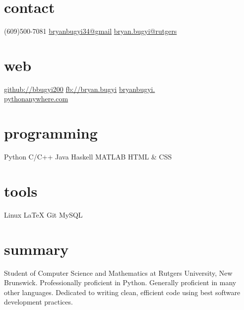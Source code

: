 \documentclass[]{friggeri-cv}
\newlength\myheight
\newlength\mydepth
\newcommand*\inlinegraphics[2]{%
  \settototalheight\myheight{Xygp}%
  \settodepth\mydepth{Xygp}%
  \raisebox{-\mydepth}{\texttt{[image: \#1]}}%
}
\begin{document}

\begin{aside}
  \section{contact}
    (609)500-7081
    \href{mailto:bryanbugyi34@gmail.com}{bryanbugyi34@gmail}
    \href{mailto:bryan.bugyi@rutgers.edu}{bryan.bugyi@rutgers}
  \section{web}
    \href{https://github.com/bbugyi200}{github://bbugyi200}
    \href{http://facebook.com/bryan.bugyi}{fb://bryan.bugyi}\vspace{0.3cm}
    \href{http://bryanbugyi.pythonanywhere.com}{bryanbugyi.\\pythonanywhere.com}
  \section{programming}
    \inlinegraphics{heart.jpg}{5} Python
    C/C++
    Java
    Haskell
    MATLAB
    HTML \& CSS
 \section{tools}
	Linux
	\LaTeX
	Git
	MySQL
\end{aside}

\section{summary}
    { \small
        Student of Computer Science and Mathematics at Rutgers University, New Brunswick. Professionally proficient in Python. Generally proficient in many other languages. Dedicated to writing clean, efficient code using best software development practices.
    }
\end{document}
